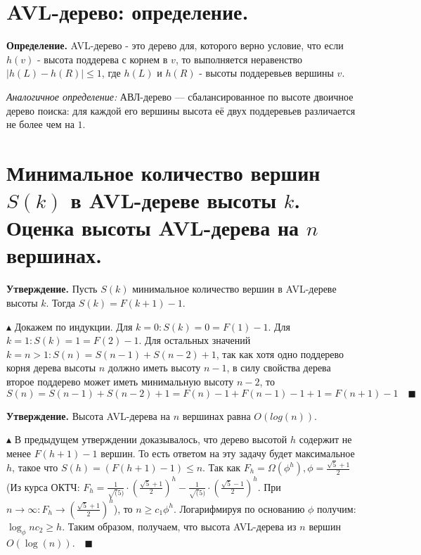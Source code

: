 \setcounter{section}{42}
\section{AVL-дерево: определение.}

\textbf{Определение.} AVL-дерево - это дерево для, которого верно условие, что если $h(v)$ - высота поддерева с корнем в $v$, то выполняется неравенство $|h(L) - h(R)| \leq 1$, где $h(L)$ и $h(R)$ - высоты поддеревьев вершины $v$. 

\textit{Аналогичное определение:} АВЛ-дерево — сбалансированное по высоте двоичное дерево поиска: для каждой его вершины высота её двух поддеревьев различается не более чем на $1$.

\setcounter{section}{43}
\section{Минимальное количество вершин $S(k)$ в AVL-дереве высоты $k$. Оценка высоты AVL-дерева на $n$ вершинах.}

\textbf{Утверждение.} Пусть $S(k)$ минимальное количество вершин в AVL-дереве высоты $k$. Тогда $S(k) = F(k + 1) - 1$.

\par $\blacktriangle$  Докажем по индукции. Для $k = 0: S(k) = 0 = F(1) - 1$. Для $k = 1: S(k) = 1 = F(2) - 1$. Для остальных значений $k = n > 1: S(n) = S(n-1) + S(n-2) + 1$, так как хотя одно поддерево корня дерева высоты $n$ должно иметь высоту $n-1$, в силу свойства дерева второе поддерево может иметь минимальную высоту $n-2$, то
$$S(n) = S(n-1) + S(n-2) + 1 = F(n) - 1 + F(n - 1) - 1 + 1 = F(n + 1) - 1 \quad \blacksquare$$

\textbf{Утверждение.} Высота AVL-дерева на $n$ вершинах равна $O(log(n))$.

\par $\blacktriangle$ В предыдущем утверждении доказывалось, что дерево высотой $h$ содержит не менее $F(h + 1) - 1$ вершин. То есть ответом на эту задачу будет максимальное $h$, такое что $S(h) = (F(h + 1) - 1) \leq n$. Так как $F_h = \Omega(\phi^h), \phi = \frac{\sqrt{5}+1}{2}$ (Из курса ОКТЧ: $F_h = \frac{1}{\sqrt(5)} \cdot \left(\frac{\sqrt{5}+1}{2}\right)^h - \frac{1}{\sqrt(5)} \cdot \left(\frac{\sqrt{5}-1}{2}\right)^h$. При $n \rightarrow \infty: F_h \rightarrow \left(\frac{\sqrt{5}+1}{2}\right)^h$), то $n \geq c_1 \phi^h$. Логарифмируя по основанию $\phi$ получим: $\log_{\phi} n c_2 \geq h$. Таким образом, получаем, что высота AVL-дерева из $n$ вершин $O(\log(n)). \quad \blacksquare$


